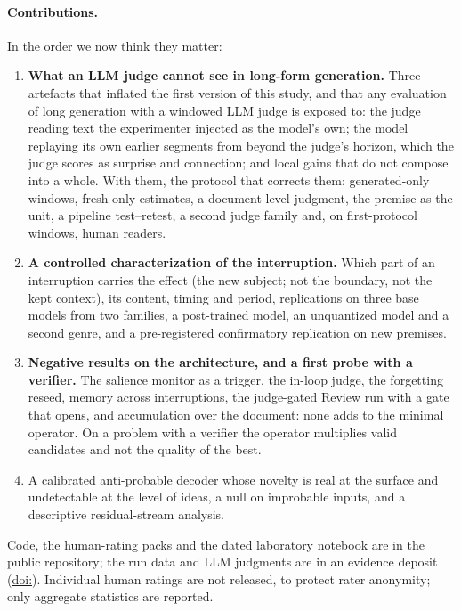 \paragraph{Contributions.} In the order we now think they matter:
\begin{enumerate}[leftmargin=1.5em,itemsep=0.1em]
\item \textbf{What an LLM judge cannot see in long-form generation.} Three
  artefacts that inflated the first version of this study, and that any
  evaluation of long generation with a windowed LLM judge is exposed to: the
  judge reading text the experimenter injected as the model's own; the model
  replaying its own earlier segments from beyond the judge's horizon, which
  the judge scores as surprise and connection; and local gains that do not
  compose into a whole. With them, the protocol that corrects them:
  generated-only windows, fresh-only estimates, a document-level judgment,
  the premise as the unit, a pipeline test--retest, a second judge family
  and, on first-protocol windows, human readers.
\item \textbf{A controlled characterization of the interruption.} Which part
  of an interruption carries the effect (the new subject; not the boundary,
  not the kept context), its content, timing and period, replications on
  three base models from two families, a post-trained model, an unquantized
  model and a second genre, and a pre-registered confirmatory replication on
  new premises.
\item \textbf{Negative results on the architecture, and a first probe with a
  verifier.} The salience monitor as a trigger, the in-loop judge, the
  forgetting reseed, memory across interruptions, the judge-gated Review run
  with a gate that opens, and accumulation over the document: none adds to
  the minimal operator. On a problem with a verifier the operator
  multiplies valid candidates and not the quality of the best.
\item A calibrated anti-probable decoder whose novelty is real at the surface
  and undetectable at the level of ideas, a null on improbable inputs, and a
  descriptive residual-stream analysis.
\end{enumerate}
Code, the human-rating packs and the dated laboratory notebook are in the
public repository; the run data and LLM judgments are in an evidence deposit
(\href{https://doi.org/\evidencedoi}{doi:\evidencedoi}). Individual human
ratings are not released, to protect rater anonymity; only aggregate
statistics are reported.
